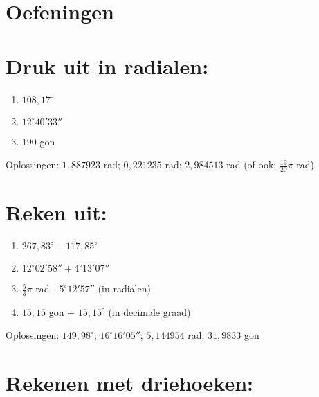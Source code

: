 \documentclass[a4paper,12pt]{article}
\begin{document}
\section*{Oefeningen}

\section{Druk uit in radialen:}

\begin{enumerate}
\item $108,17^\circ$ 
\item $12^\circ 40' 33''$ 
\item $190$ gon
\end{enumerate}

Oplossingen: $1,887923$ rad; $0,221235$ rad; $2,984513$ rad (of ook: $\frac{19}{20}\pi$ rad)\\

\section{Reken uit:}

\begin{enumerate}
\item $267,83^\circ - 117,85^\circ$
\item $12^\circ 02' 58'' + 4^\circ 13' 07''$
\item $\frac{5}{3}\pi$ rad - $5^\circ 12' 57''$ (in radialen)
\item $15,15$ gon + $15,15^\circ$ (in decimale graad)
\end{enumerate}

Oplossingen: $149,98^\circ$; $16^\circ 16' 05''$; $5,144954$ rad; $31,9833$ gon

\newpage

\section{Rekenen met driehoeken:}
\end{document}
